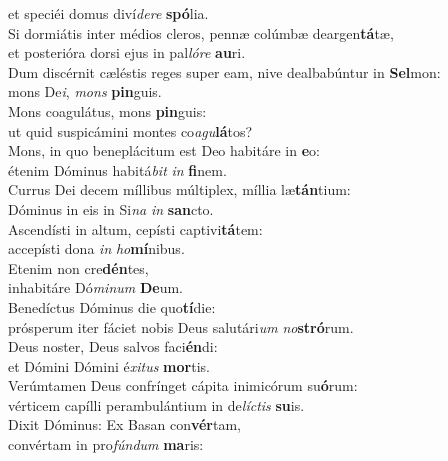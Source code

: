\oddverse et speciéi domus diví\textit{de}\textit{re} \textbf{spó}lia.\\
\evenverse Si dormiátis inter médios cleros, pennæ colúmbæ deargen\textbf{tá}tæ,~\*\\
\evenverse et posterióra dorsi ejus in pal\textit{ló}\textit{re} \textbf{au}ri.\\
\oddverse Dum discérnit cæléstis reges super eam, nive dealbabúntur in \textbf{Sel}mon:~\*\\
\oddverse mons De\textit{i}, \textit{mons} \textbf{pin}guis.\\
\evenverse Mons coagulátus, mons \textbf{pin}guis:~\*\\
\evenverse ut quid suspicámini montes co\textit{a}\textit{gu}\textbf{lá}tos?\\
\oddverse Mons, in quo beneplácitum est Deo habitáre in \textbf{e}o:~\*\\
\oddverse étenim Dóminus habitá\textit{bit} \textit{in} \textbf{fi}nem.\\
\evenverse Currus Dei decem míllibus múltiplex, míllia læ\textbf{tán}tium:~\*\\
\evenverse Dóminus in eis in Si\textit{na} \textit{in} \textbf{san}cto.\\
\oddverse Ascendísti in altum, cepísti captivi\textbf{tá}tem:~\*\\
\oddverse accepísti dona \textit{in} \textit{ho}\textbf{mí}nibus.\\
\evenverse Etenim non cre\textbf{dén}tes,~\*\\
\evenverse inhabitáre Dó\textit{mi}\textit{num} \textbf{De}um.\\
\oddverse Benedíctus Dóminus die quo\textbf{tí}die:~\*\\
\oddverse prósperum iter fáciet nobis Deus salutári\textit{um} \textit{no}\textbf{stró}rum.\\
\evenverse Deus noster, Deus salvos faci\textbf{én}di:~\*\\
\evenverse et Dómini Dómini é\textit{xi}\textit{tus} \textbf{mor}tis.\\
\oddverse Verúmtamen Deus confrínget cápita inimicórum su\textbf{ó}rum:~\*\\
\oddverse vérticem capílli perambulántium in de\textit{lí}\textit{ctis} \textbf{su}is.\\
\evenverse Dixit Dóminus: Ex Basan con\textbf{vér}tam,~\*\\
\evenverse convértam in pro\textit{fún}\textit{dum} \textbf{ma}ris:\\
